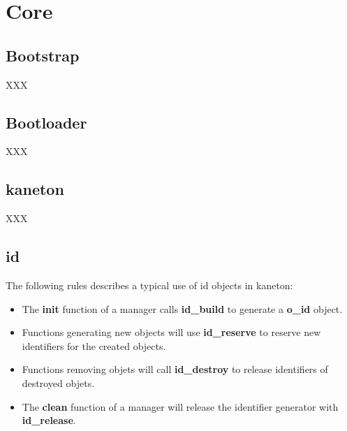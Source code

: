 
%
%

\chapter{Core}

\newpage

%
%

%
%

\section{Bootstrap}

XXX

%
%

\section{Bootloader}

XXX

%
%

\section{kaneton}

XXX

%
%

\section{id}

The following rules describes a typical use of id objects in kaneton:

\begin{itemize}
  \item
    The \textbf{init} function of a manager calls \textbf{id\_build}
    to generate a \textbf{o\_id} object.
  \item
    Functions generating new objects will use \textbf{id\_reserve} to
    reserve new identifiers for the created objects.
  \item
    Functions removing objets will call \textbf{id\_destroy} to release
    identifiers of destroyed objets.
  \item
    The \textbf{clean} function of a manager will release the identifier
    generator with \textbf{id\_release}.
\end{itemize}
